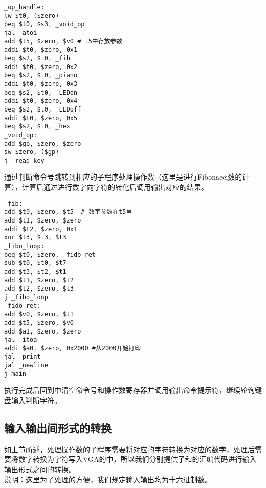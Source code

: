 \begin{lstlisting}[style=assembler-style, caption={\_op\_handle}]
_op_handle:
lw $t0, ($zero)
beq $t0, $s3, _void_op
jal _atoi
add $t5, $zero, $v0 # t5中存放参数
addi $t0, $zero, 0x1
beq $s2, $t0, _fib
addi $t0, $zero, 0x2
beq $s2, $t0, _piano
addi $t0, $zero, 0x3
beq $s2, $t0, _LEDon
addi $t0, $zero, 0x4
beq $s2, $t0, _LEDoff
addi $t0, $zero, 0x5
beq $s2, $t0, _hex
_void_op:
add $gp, $zero, $zero
sw $zero, ($gp)
j _read_key
\end{lstlisting}
\hspace*{5mm}通过判断命令号跳转到相应的子程序处理操作数（这里是进行Fibonacci数的计算），计算后通过进行数字向字符的转化后调用输出对应的结果。
\begin{lstlisting}[style=assembler-style, caption={Calculation of Fibonacci number}]
_fib:
add $t0, $zero, $t5  # 数字参数在t5里
add $t1, $zero, $zero
addi $t2, $zero, 0x1
xor $t3, $t3, $t3
_fibo_loop:
beq $t0, $zero, _fido_ret
sub $t0, $t0, $t7
add $t3, $t2, $t1
add $t1, $zero, $t2
add $t2, $zero, $t3
j _fibo_loop
_fido_ret:
add $v0, $zero, $t1
add $t5, $zero, $v0
add $a1, $zero, $zero
jal _itoa
addi $a0, $zero, 0x2000 #从2000开始打印
jal _print
jal _newline
j main
\end{lstlisting}
\hspace*{5mm}执行完成后回到中清空命令号和操作数寄存器并调用输出命令提示符，继续轮询键盘输入判断字符。
\subsection{输入输出间形式的转换}
\songti
\hspace*{5mm}如上节所述，处理操作数的子程序需要将对应的字符转换为对应的数字，处理后需要将数字转换为字符写入VGA的中，所以我们分别提供了和的汇编代码进行输入输出形式之间的转换。
\kaishu
\\\hspace*{5mm}说明：这里为了处理的方便，我们规定输入输出均为十六进制数。
